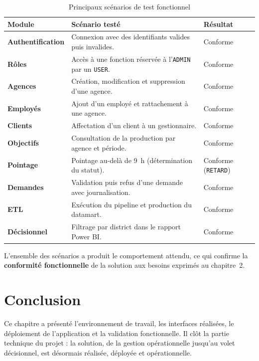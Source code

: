 \begin{table}[htbp]
\centering
\caption{Principaux scénarios de test fonctionnel}
\label{tab:tests}
\renewcommand{\arraystretch}{1.2}
\begin{tabularx}{\textwidth}{|>{\bfseries}p{3.1cm}|X|p{1.9cm}|}
\hline
\textmd{\textbf{Module}} & \textbf{Scénario testé} & \textbf{Résultat}\\
\hline
Authentification & Connexion avec des identifiants valides puis invalides. & Conforme\\
\hline
Rôles & Accès à une fonction réservée à l'\texttt{ADMIN} par un \texttt{USER}. & Conforme\\
\hline
Agences & Création, modification et suppression d'une agence. & Conforme\\
\hline
Employés & Ajout d'un employé et rattachement à une agence. & Conforme\\
\hline
Clients & Affectation d'un client à un gestionnaire. & Conforme\\
\hline
Objectifs & Consultation de la production par agence et période. & Conforme\\
\hline
Pointage & Pointage au-delà de 9~h (détermination du statut). & Conforme (\texttt{RETARD})\\
\hline
Demandes & Validation puis refus d'une demande avec journalisation. & Conforme\\
\hline
ETL & Exécution du pipeline et production du datamart. & Conforme\\
\hline
Décisionnel & Filtrage par district dans le rapport Power BI. & Conforme\\
\hline
\end{tabularx}
\end{table}

L'ensemble des scénarios a produit le comportement attendu, ce qui confirme la
\textbf{conformité fonctionnelle} de la solution aux besoins exprimés au
chapitre~2.

\section*{Conclusion}
Ce chapitre a présenté l'environnement de travail, les interfaces réalisées, le
déploiement de l'application et la validation fonctionnelle. Il clôt la partie
technique du projet : la solution, de la gestion opérationnelle jusqu'au volet
décisionnel, est désormais réalisée, déployée et opérationnelle.
